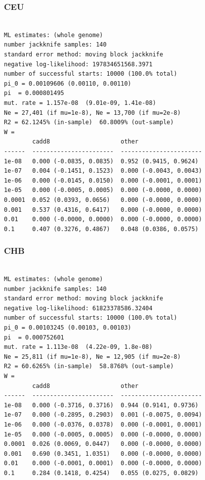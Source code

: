 \documentclass[11pt]{article}
\begin{document}
\subsubsection*{CEU}
\begin{minipage}{\linewidth}\begin{footnotesize}
\begin{verbatim}

ML estimates: (whole genome)
number jackknife samples: 140
standard error method: moving block jackknife
negative log-likelihood: 197834651568.3971
number of successful starts: 10000 (100.0% total)
pi_0 = 0.00109606 (0.00110, 0.00110)
pi  = 0.000801495
mut. rate = 1.157e-08  (9.01e-09, 1.41e-08)
Ne = 27,401 (if mu=1e-8), Ne = 13,700 (if mu=2e-8)
R2 = 62.1245% (in-sample)  60.8009% (out-sample)
W = 
        cadd8                    other
------  -----------------------  -----------------------
1e-08   0.000 (-0.0835, 0.0835)  0.952 (0.9415, 0.9624)
1e-07   0.004 (-0.1451, 0.1523)  0.000 (-0.0043, 0.0043)
1e-06   0.000 (-0.0145, 0.0150)  0.000 (-0.0001, 0.0001)
1e-05   0.000 (-0.0005, 0.0005)  0.000 (-0.0000, 0.0000)
0.0001  0.052 (0.0393, 0.0656)   0.000 (-0.0000, 0.0000)
0.001   0.537 (0.4316, 0.6417)   0.000 (-0.0000, 0.0000)
0.01    0.000 (-0.0000, 0.0000)  0.000 (-0.0000, 0.0000)
0.1     0.407 (0.3276, 0.4867)   0.048 (0.0386, 0.0575)
\end{verbatim}
\end{footnotesize}\end{minipage}


\subsubsection*{CHB}
\begin{minipage}{\linewidth}\begin{footnotesize}
\begin{verbatim}

ML estimates: (whole genome)
number jackknife samples: 140
standard error method: moving block jackknife
negative log-likelihood: 61823378586.32404
number of successful starts: 10000 (100.0% total)
pi_0 = 0.00103245 (0.00103, 0.00103)
pi  = 0.000752601
mut. rate = 1.113e-08  (4.22e-09, 1.8e-08)
Ne = 25,811 (if mu=1e-8), Ne = 12,905 (if mu=2e-8)
R2 = 60.6265% (in-sample)  58.8768% (out-sample)
W = 
        cadd8                    other
------  -----------------------  -----------------------
1e-08   0.000 (-0.3716, 0.3716)  0.944 (0.9141, 0.9736)
1e-07   0.000 (-0.2895, 0.2903)  0.001 (-0.0075, 0.0094)
1e-06   0.000 (-0.0376, 0.0378)  0.000 (-0.0001, 0.0001)
1e-05   0.000 (-0.0005, 0.0005)  0.000 (-0.0000, 0.0000)
0.0001  0.026 (0.0069, 0.0447)   0.000 (-0.0000, 0.0000)
0.001   0.690 (0.3451, 1.0351)   0.000 (-0.0000, 0.0000)
0.01    0.000 (-0.0001, 0.0001)  0.000 (-0.0000, 0.0000)
0.1     0.284 (0.1418, 0.4254)   0.055 (0.0275, 0.0829)
\end{verbatim}
\end{footnotesize}\end{minipage}
\end{document}
